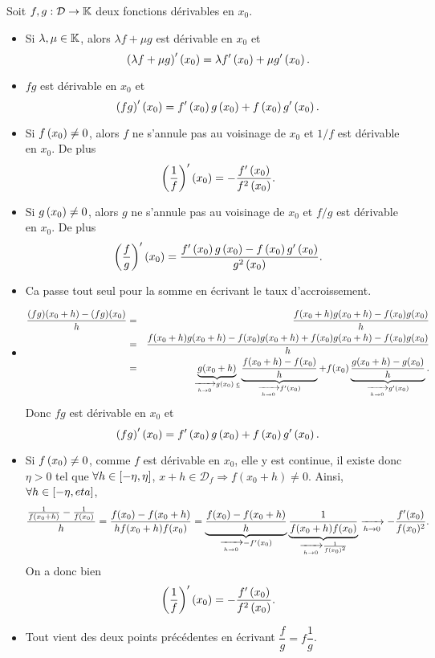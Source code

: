 \documentclass{magnoliaold}
\begin{document}
\begin{proposition}[utile=-3]
Soit $f,g:\mathcal{D}\to\mathbb{K}$ deux fonctions dérivables en $x_0$.
\begin{itemize}
\item Si $\lambda,\mu\in\mathbb{K}$, alors $\lambda f+\mu g$ est dérivable
  en $x_0$ et
  \[\left(\lambda f+\mu g\right)'\left(x_0\right)=\lambda f'\left(x_0\right)+\mu g'\left(x_0\right).\]
\item $fg$ est dérivable en $x_0$ et
  \[\left(fg\right)'\left(x_0\right)=f'\left(x_0\right)g\left(x_0\right)+f\left(x_0\right)g'\left(x_0\right).\]
\item Si $f\left(x_0\right)\neq 0$, alors $f$ ne s'annule pas au voisinage de $x_0$
  et $1/f$ est dérivable en $x_0$. De plus
  \[\left(\frac{1}{f}\right)'\left(x_0\right)=-\frac{f'\left(x_0\right)}{f^2\left(x_0\right)}.\]
\item Si $g\left(x_0\right)\neq 0$, alors $g$ ne s'annule pas au voisinage de $x_0$
  et $f/g$ est dérivable en $x_0$. De plus
  \[\left(\frac{f}{g}\right)'\left(x_0\right)=\frac{f'\left(x_0\right)g\left(x_0\right)-f\left(x_0\right)g'\left(x_0\right)}{
    g^2\left(x_0\right)}.\]
\end{itemize}
\end{proposition}

\begin{preuve}
\begin{itemize}
\item Ca passe tout seul pour la somme en écrivant le taux d'accroissement.
\item 
\begin{eqnarray*}
\frac{(fg)(x_0+h)-(fg)(x_0)}{h}&=&\frac{f(x_0+h)g(x_0+h)-f(x_0)g(x_0)}{h}\\
&=&\frac{f(x_0+h)g(x_0+h)-f(x_0)g(x_0+h)+f(x_0)g(x_0+h)-f(x_0)g(x_0)}{h}\\
&=&\underbrace{g(x_0+h)}_{\xrightarrow[h\rightarrow 0]{}g(x_0) \text { \underline{c}}}\underbrace{\frac{f(x_0+h)-f(x_0)}{h}}_{\xrightarrow[h\rightarrow 0]{}f'(x_0)}+f(x_0)\underbrace{\frac{g(x_0+h)-g(x_0)}{h}}_{\xrightarrow[h\rightarrow 0]{}g'(x_0)}.
\end{eqnarray*}
Donc $fg$ est dérivable en $x_0$ et
  \[\left(fg\right)'\left(x_0\right)=f'\left(x_0\right)g\left(x_0\right)+f\left(x_0\right)g'\left(x_0\right).\]
  \item Si $f\left(x_0\right)\neq 0$, comme $f$ est dérivable en $x_0$, elle y est continue, il existe donc $\eta>0$ tel que $\forall h\in \left[-\eta,\eta\right]$, $x+h\in \mathcal{D}_f \Longrightarrow f(x_0+h)\neq 0$. Ainsi, $\forall h \in \left[-\eta,eta\right]$, $$\frac{\frac{1}{f(x_0+h)}-\frac{1}{f(x_0)}}{h}=\frac{f(x_0)-f(x_0+h)}{hf(x_0+h)f(x_0)}=\underbrace{\frac{f(x_0)-f(x_0+h)}{h}}_{\xrightarrow[h\rightarrow 0]{}-f'(x_0)}\underbrace{\frac{1}{f(x_0+h)f(x_0)}}_{\xrightarrow[h\rightarrow 0]{}\frac{1}{f(x_0)^2}}\xrightarrow[h\rightarrow 0]{}-\frac{f'(x_0)}{f(x_0)^2}.$$
  On a donc bien
    \[\left(\frac{1}{f}\right)'\left(x_0\right)=-\frac{f'\left(x_0\right)}{f^2\left(x_0\right)}.\]
\item Tout vient des deux points précédentes en écrivant $\dfrac{f}{g}=f\dfrac{1}{g}$.
\end{itemize}

\end{preuve}
\end{document}
